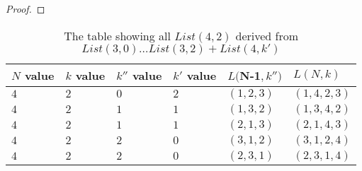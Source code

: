 \begin{proof}
\end{proof}

\begin{table}
  \begin{tabular}{|p{2cm}||p{2cm}||p{2cm}||p{2cm} ||p{2cm} ||p{2cm}||}
     \hline
        \small{$N$ value}& \small{$k$ value} & \small{$k''$ value} & \small{$k'$ value} &\small{$L($N-1$, k'')$} & \small{$L(N, k)$}\\
        \hline
        \small{$4$} & \small{$2$} & \small{$0$} & \small{$2$} & \small{$(1,2,3)$} & \small{$(1,4,2,3)$} \\
        \hline
        \small{$4$} & \small{$2$} & \small{$1$} & \small{$1$} & \small{$(1,3,2)$} & \small{$(1,3,4,2)$} \\
        \small{$4$} & \small{$2$} & \small{$1$} & \small{$1$} & \small{$(2,1,3)$} & \small{$(2,1,4,3)$} \\
        \hline
        \small{$4$} & \small{$2$} & \small{$2$} & \small{$0$} & \small{$(3,1,2)$} & \small{$(3,1,2,4)$} \\                
        \small{$4$} & \small{$2$} & \small{$2$} & \small{$0$} & \small{$(2,3,1)$} & \small{$(2,3,1,4)$} \\
        \hline
  \end{tabular}
  \caption{The table showing all $List(4, 2)$ derived from $List(3, 0) \dots List(3, 2) + List(4, k')$}
  \label{Table:List4,2}
\end{table}




